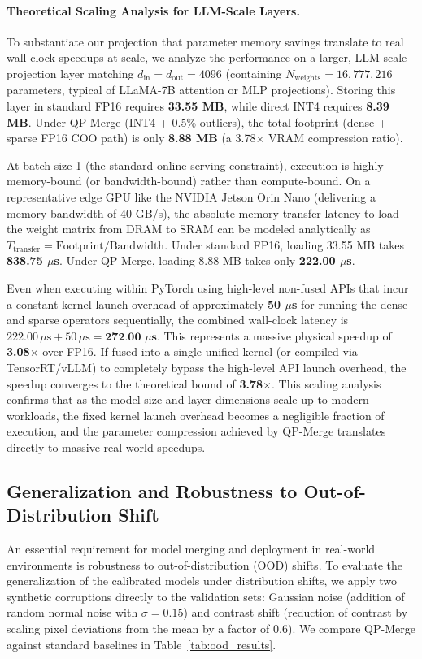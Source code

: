 \paragraph{Theoretical Scaling Analysis for LLM-Scale Layers.}
To substantiate our projection that parameter memory savings translate to real wall-clock speedups at scale, we analyze the performance on a larger, LLM-scale projection layer matching $d_{\text{in}} = d_{\text{out}} = 4096$ (containing $N_{\text{weights}} = 16,777,216$ parameters, typical of LLaMA-7B attention or MLP projections). Storing this layer in standard FP16 requires \textbf{33.55 MB}, while direct INT4 requires \textbf{8.39 MB}. Under QP-Merge (INT4 + 0.5\% outliers), the total footprint (dense + sparse FP16 COO path) is only \textbf{8.88 MB} (a 3.78$\times$ VRAM compression ratio).

At batch size 1 (the standard online serving constraint), execution is highly memory-bound (or bandwidth-bound) rather than compute-bound. On a representative edge GPU like the NVIDIA Jetson Orin Nano (delivering a memory bandwidth of $40$ GB/s), the absolute memory transfer latency to load the weight matrix from DRAM to SRAM can be modeled analytically as $T_{\text{transfer}} = \text{Footprint} / \text{Bandwidth}$. Under standard FP16, loading 33.55 MB takes \textbf{838.75 $\mu$s}. Under QP-Merge, loading 8.88 MB takes only \textbf{222.00 $\mu$s}.

Even when executing within PyTorch using high-level non-fused APIs that incur a constant kernel launch overhead of approximately \textbf{50 $\mu$s} for running the dense and sparse operators sequentially, the combined wall-clock latency is $222.00\,\mu\text{s} + 50\,\mu\text{s} = \textbf{272.00 $\mu$s}$. This represents a massive physical speedup of \textbf{3.08$\times$} over FP16. If fused into a single unified kernel (or compiled via TensorRT/vLLM) to completely bypass the high-level API launch overhead, the speedup converges to the theoretical bound of \textbf{3.78$\times$}. This scaling analysis confirms that as the model size and layer dimensions scale up to modern workloads, the fixed kernel launch overhead becomes a negligible fraction of execution, and the parameter compression achieved by QP-Merge translates directly to massive real-world speedups.

\subsection{Generalization and Robustness to Out-of-Distribution Shift}
An essential requirement for model merging and deployment in real-world environments is robustness to out-of-distribution (OOD) shifts. To evaluate the generalization of the calibrated models under distribution shifts, we apply two synthetic corruptions directly to the validation sets: Gaussian noise (addition of random normal noise with $\sigma=0.15$) and contrast shift (reduction of contrast by scaling pixel deviations from the mean by a factor of 0.6). We compare QP-Merge against standard baselines in Table~\ref{tab:ood_results}.

